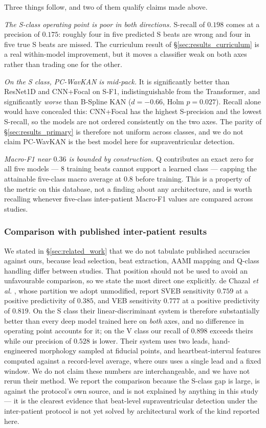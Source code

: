 \documentclass[journal,twoside,web]{ieeecolor}
\begin{document}
Three things follow, and two of them qualify claims made above.

\emph{The S-class operating point is poor in both directions.} S-recall of
$0.198$ comes at a precision of $0.175$: roughly four in five predicted S beats
are wrong and four in five true S beats are missed. The curriculum result of
\S\ref{sec:results_curriculum} is a real within-model improvement, but it moves
a classifier weak on both axes rather than trading one for the other.

\emph{On the S class, PC-WavKAN is mid-pack.} It is significantly better than
ResNet1D and CNN+Focal on S-F1, indistinguishable from the Transformer, and
significantly \emph{worse} than B-Spline KAN ($d=-0.66$, Holm $p=0.027$).
Recall alone would have concealed this: CNN+Focal has the highest S-precision
and the lowest S-recall, so the models are not ordered consistently on the two
axes. The parity of \S\ref{sec:results_primary} is therefore not uniform across
classes, and we do not claim PC-WavKAN is the best model here for
supraventricular detection.

\emph{Macro-F1 near $0.36$ is bounded by construction.} Q contributes an exact
zero for all five models --- 8 training beats cannot support a learned class ---
capping the attainable five-class macro average at $0.8$ before training. This
is a property of the metric on this database, not a finding about any
architecture, and is worth recalling whenever five-class inter-patient
Macro-F1 values are compared across studies.

\subsubsection*{Comparison with published inter-patient results}
We stated in \S\ref{sec:related_work} that we do not tabulate published
accuracies against ours, because lead selection, beat extraction, AAMI mapping
and Q-class handling differ between studies. That position should not be used
to avoid an unfavourable comparison, so we state the most direct one
explicitly. de Chazal \emph{et al.} \cite{chazal_automatic_2004}, whose
partition we adopt unmodified, report SVEB sensitivity $0.759$ at a positive
predictivity of $0.385$, and VEB sensitivity $0.777$ at a positive
predictivity of $0.819$. On the S class their linear-discriminant system is
therefore substantially better than every deep model trained here on
\emph{both} axes, and no difference in operating point accounts for it; on the
V class our recall of $0.898$ exceeds theirs while our precision of $0.528$ is
lower. Their system uses two leads, hand-engineered morphology sampled at
fiducial points, and heartbeat-interval features computed against a
record-level average, where ours uses a single lead and a fixed window. We do
not claim these numbers are interchangeable, and we have not rerun their
method. We report the comparison because the S-class gap is large, is against
the protocol's own source, and is not explained by anything in this study ---
it is the clearest evidence that beat-level supraventricular detection under
the inter-patient protocol is not yet solved by architectural work of the kind
reported here.
\end{document}
